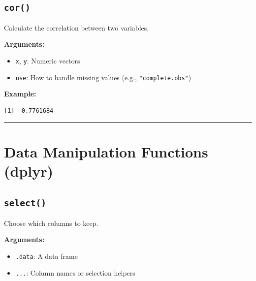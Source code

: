 \documentclass[
  letterpaper,
  DIV=11,
  numbers=noendperiod]{scrreprt}
\newenvironment{Shaded}{\begin{snugshade}}{\end{snugshade}}
\newcommand{\FunctionTok}[1]{\textcolor[rgb]{0.28,0.35,0.67}{#1}}
\newcommand{\NormalTok}[1]{\textcolor[rgb]{0.00,0.23,0.31}{#1}}
\newcommand{\SpecialCharTok}[1]{\textcolor[rgb]{0.37,0.37,0.37}{#1}}
\providecommand{\tightlist}{%
  \setlength{\itemsep}{0pt}\setlength{\parskip}{0pt}}
\begin{document}
\subsection{\texorpdfstring{\texttt{cor()}}{cor()}}\label{cor}

Calculate the correlation between two variables.

\textbf{Arguments:}

\begin{itemize}
\tightlist
\item
  \texttt{x}, \texttt{y}: Numeric vectors
\item
  \texttt{use}: How to handle missing values (e.g.,
  \texttt{"complete.obs"})
\end{itemize}

\textbf{Example:}

\begin{Shaded}
\end{Shaded}

\begin{verbatim}
[1] -0.7761684
\end{verbatim}

\begin{center}\rule{0.5\linewidth}{0.5pt}\end{center}

\section{Data Manipulation Functions
(dplyr)}\label{data-manipulation-functions-dplyr}

\subsection{\texorpdfstring{\texttt{select()}}{select()}}\label{select}

Choose which columns to keep.

\textbf{Arguments:}

\begin{itemize}
\tightlist
\item
  \texttt{.data}: A data frame
\item
  \texttt{...}: Column names or selection helpers
\end{itemize}
\end{document}
